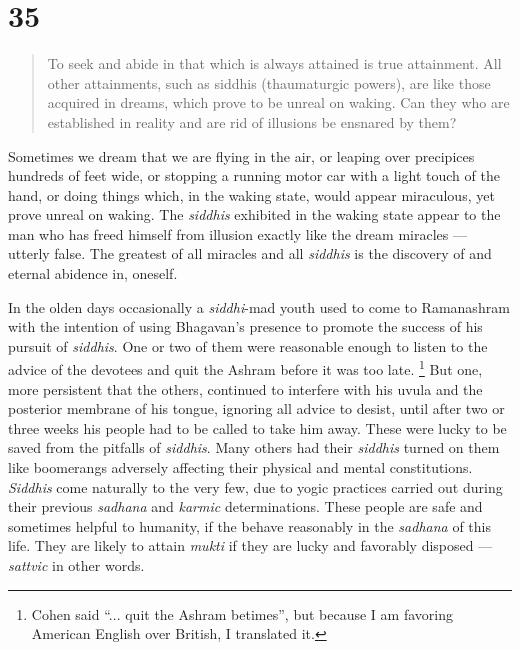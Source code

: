 \documentclass[12pt]{report}
\begin{document}
{\section*{35}

\begin{quote}
  To seek and abide in that which is always attained is true
  attainment. All other attainments, such as siddhis (thaumaturgic
  powers), are like those acquired in dreams, which prove to be unreal
  on waking. Can they who are established in reality and are rid of
  illusions be ensnared by them?
\end{quote}


Sometimes we dream that we are flying in the air, or leaping over
precipices hundreds of feet wide, or stopping a running motor car with
a light touch of the hand, or doing things which, in the waking state,
would appear miraculous, yet prove unreal on waking. The
\emph{siddhis} exhibited in the waking state appear to the man who has
freed himself from illusion exactly like the dream miracles ---
utterly false. The greatest of all miracles and all \emph{siddhis} is
the discovery of and eternal abidence in, oneself.

In the olden days occasionally a \emph{siddhi}-mad youth used to come
to Ramanashram with the intention of using Bhagavan's presence to
promote the success of his pursuit of \emph{siddhis}. One or two of
them were reasonable enough to listen to the advice of the devotees
and quit the Ashram before it was too late. \footnote{Cohen said
  ``... quit the Ashram betimes'', but because I am favoring American
  English over British, I translated it.} But one, more persistent
that the others, continued to interfere with his uvula and the
posterior membrane of his tongue, ignoring all advice to desist, until
after two or three weeks his people had to be called to take him
away. These were lucky to be saved from the pitfalls of
\emph{siddhis}. Many others had their \emph{siddhis} turned on them
like boomerangs adversely affecting their physical and mental
constitutions. \emph{Siddhis} come naturally to the very few, due to
yogic practices carried out during their previous \emph{sadhana} and
\emph{karmic} determinations. These people are safe and sometimes
helpful to humanity, if the behave reasonably in the \emph{sadhana} of
this life. They are likely to attain \emph{mukti} if they are lucky
and favorably disposed --- \emph{sattvic} in other words.

}
\end{document}
